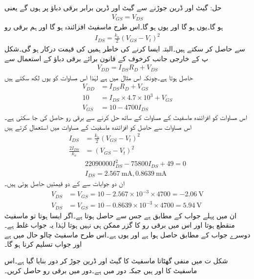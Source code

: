 حل:	گیٹ اور ڈرین جوڑنے سے گیٹ اور ڈرین برابر برقی دباؤ پر ہوں گے یعنی 
\begin{align*}
V_{GS}=V_{DS}
\end{align*}
ہو گا۔یوں    ہو گا اور یوں  ہو گا۔اس طرح ماسفیٹ افزائندہ ہو گا اور ہم برقی رو
\begin{align*}
I_{DS}=\frac{k_n}{2}\left(V_{GS}-V_t \right )^{2}
\end{align*}
سے حاصل کر سکتے ہیں۔البتہ ایسا کرنے کی خاطر ہمیں  کی قیمت درکار ہو گی۔شکل  پ کے خارجی جانب کرخوف کے قانون برائے برقی دباؤ کے استعمال سے 
\begin{align*}
V_{DD}=I_{DS} R_D+V_{DS}
\end{align*}
حاصل ہوتا ہے۔چونکہ اس مثال میں   ہے لہٰذا اس مساوات کو یوں لکھ سکتے ہیں
\begin{align*}
V_{DD}&=I_{DS}R_D+V_{GS}\\
10&=I_{DS} \times 4.7 \times 10^{3}+V_{GS}\\
V_{GS}&=10-4700 I_{DS}
\end{align*}
اس مساوات کو افزائندہ ماسفیٹ کے مساوات کے ساتھ حل کرنے سے برقی رو حاصل کی جا سکتی ہے۔اس مساوات سے حاصل  کو افزائندہ ماسفیٹ کے مساوات میں استعمال کرتے ہیں
\begin{align*}
I_{DS}&=\frac{k_n}{2} \left(V_{GS}-V_t \right )^2\\
\frac{2 I_{DS}}{k_n}&= \left(V_{GS}-V_t \right )^2\\
& 22090000I_{DS}^{2}-75800 I_{DS}+49=0\\
& I_{DS}=\SI{2.567}{\milli \ampere}, \SI{0.8639}{\milli \ampere}
\end{align*}
ان دو جوابات سے  کے دو قیمتیں حاصل ہوتی ہیں۔
\begin{align*}
V_{DS}&=V_{GS}=10-2.567 \times 10^{-3} \times 4700=\SI{-2.06}{\volt}\\
V_{DS}&=V_{GS}=10-0.8639 \times 10^{-3} \times 4700=\SI{5.94}{\volt}
\end{align*}
ان میں پہلے جواب کے مطابق  ہے جس سے  حاصل ہوتا ہے۔اگر ایسا ہوتا تو ماسفیٹ منقطع ہوتا اور اس میں برقی رو کا گزر ممکن ہی نہیں ہوتا لہٰذا یہ جواب غلط ہے۔دوسرے جواب کے مطابق    حاصل ہوا ہے اور یوں  ہے۔اس طرح ماسفیٹ چالو حال میں ہے اور جواب تسلیم کرنا ہو گا۔



 
شکل  ت میں منفی گھٹاتا ماسفیٹ کا گیٹ اور ڈرین جوڑ کر دور بنایا گیا ہے۔اس ماسفیٹ کا  اور  ہیں  جبکہ دور میں  ہے۔دور میں برقی رو حاصل کریں۔

